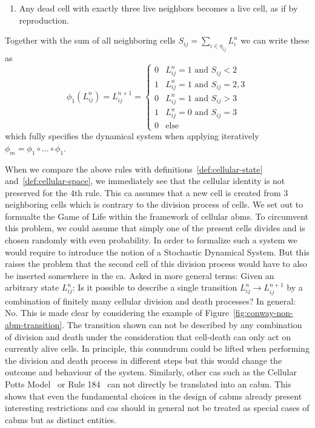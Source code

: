\begin{example}
\begin{enumerate}
        \item Any dead cell with exactly three live neighbors becomes a live cell, as if by
            reproduction.
    \end{enumerate}
    Together with the sum of all neighboring cells $S_{ij}=\sum\limits_{\iota\in\eta_{ij}}L^n_\iota$
    we can write these as
    \begin{equation}
        \phi_1(L_{ij}^n) = L_{ij}^{n+1} =
        \begin{cases}
            0 &L^n_{ij}=1 \text{ and } S_{ij}<2\\
            1 &L^n_{ij}=1 \text{ and } S_{ij}=2,3\\
            0 &L^n_{ij}=1 \text{ and } S_{ij}>3\\
            1 &L^n_{ij}=0 \text{ and } S_{ij}=3\\
            0 &\text{else}
        \end{cases}
    \end{equation}
    which fully specifies the dynamical system when applying iteratively
    $\phi_m=\phi_1\circ\dots\circ\phi_1$.
\end{example}

When we compare the above rules with definitions~\ref{def:cellular-state}
and~\ref{def:cellular-space}, we immediately see that the cellular identity is not preserved for the
4th rule.
This \ac{ca} assumes that a new cell is created from 3 neighboring cells which is contrary to the
division process of cells.
We set out to formualte the Game of Life within the framework of cellular \acp{abm}.
To circumvent this problem, we could assume that simply one of the present cells divides and is
chosen randomly with even probability.
In order to formalize such a system we would require to introduce the notion of a
Stochastic Dynamical System.
But this raises the problem that the second cell of this division process would have to also be
inserted somewhere in the \ac{ca}.
Asked in more general terms: Given an arbitrary state $L^n_{ij}$:
Is it possible to describe a single transition $L^n_{ij}\rightarrow L^{n+1}_{ij}$ by a combination
of finitely many cellular division and death processes?
In general: No.
This is made clear by considering the example of Figure~\ref{fig:conway-non-abm-transition}.
The transition shown can not be described by any combination of division and death under the
consideration that cell-death can only act on currently alive cells.
In principle, this conundrum could be lifted when performing the division and death process in
different steps but this would change the outcome and behaviour of the system.
Similarly, other \acp{ca} such as the Cellular Potts Model~\cite{Graner1992} or Rule
184~\cite{Krug1988} can not
directly be translated into an \ac{cabm}.
This shows that even the fundamental choices in the design of \acp{cabm} already present interesting
restrictions and \acp{ca} should in general not be treated as special cases of \acp{cabm} but as
distinct entities.

